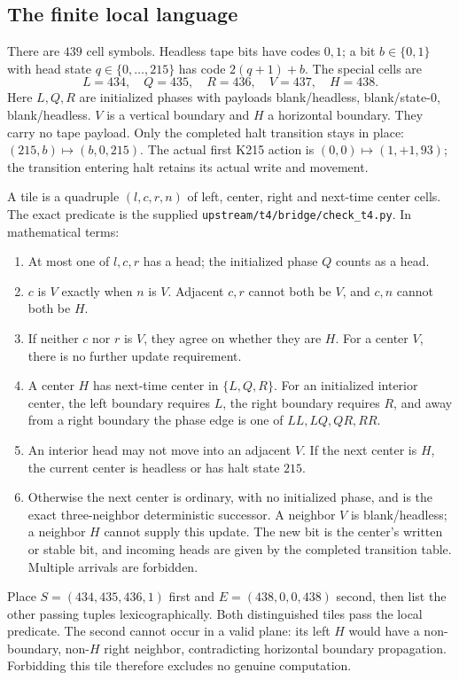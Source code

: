 \documentclass[11pt,a4paper]{article}
\theoremstyle{remark}
\begin{document}
\subsection{The finite local language}

There are $439$ cell symbols.  Headless tape bits have codes $0,1$;
a bit $b\in\{0,1\}$ with head state $q\in\{0,\ldots,215\}$ has
code $2(q+1)+b$.  The special cells are
\[
 L=434,\quad Q=435,\quad R=436,\quad V=437,\quad H=438.
\]
Here $L,Q,R$ are initialized phases with payloads blank/headless,
blank/state-$0$, blank/headless.  $V$ is a vertical boundary and $H$ a
horizontal boundary.  They carry no tape payload.  Only the completed
halt transition stays in place: $(215,b)\mapsto(b,0,215)$.  The actual
first K215 action is $(0,0)\mapsto(1,+1,93)$; the transition entering
halt retains its actual write and movement.

A tile is a quadruple $(l,c,r,n)$ of left, center, right and next-time
center cells.  The exact predicate is the supplied
\texttt{upstream/t4/bridge/check\_t4.py}.  In mathematical terms:
\begin{enumerate}
\item At most one of $l,c,r$ has a head; the initialized phase $Q$
counts as a head.
\item $c$ is $V$ exactly when $n$ is $V$.  Adjacent $c,r$ cannot both
be $V$, and $c,n$ cannot both be $H$.
\item If neither $c$ nor $r$ is $V$, they agree on whether they are $H$.
For a center $V$, there is no further update requirement.
\item A center $H$ has next-time center in $\{L,Q,R\}$.
For an initialized interior center, the left boundary requires $L$,
the right boundary requires $R$, and away from a right boundary the
phase edge is one of $LL,LQ,QR,RR$.
\item An interior head may not move into an adjacent $V$.  If the next
center is $H$, the current center is headless or has halt state $215$.
\item Otherwise the next center is ordinary, with no initialized phase,
and is the exact three-neighbor deterministic successor.  A neighbor $V$
is blank/headless; a neighbor $H$ cannot supply this update.  The new
bit is the center's written or stable bit, and incoming heads are given
by the completed transition table.  Multiple arrivals are forbidden.
\end{enumerate}

Place $S=(434,435,436,1)$ first and $E=(438,0,0,438)$ second, then
list the other passing tuples lexicographically.  Both distinguished
tiles pass the local predicate.  The second cannot occur in a valid
plane: its left $H$ would have a non-boundary, non-$H$ right neighbor,
contradicting horizontal boundary propagation.  Forbidding this tile
therefore excludes no genuine computation.
\end{document}
